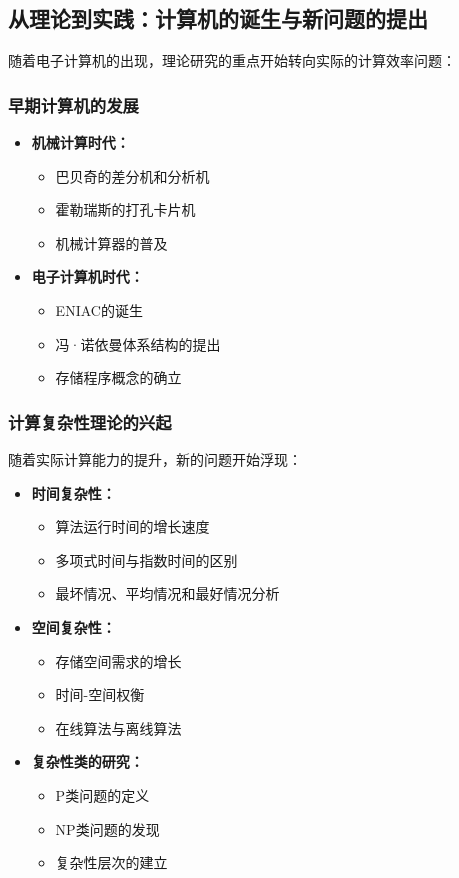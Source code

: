\documentclass[a4paper,12pt]{ctexart}
\begin{document}
\subsection{从理论到实践：计算机的诞生与新问题的提出}
随着电子计算机的出现，理论研究的重点开始转向实际的计算效率问题：

\subsubsection{早期计算机的发展}
\begin{itemize}
    \item \textbf{机械计算时代：}
        \begin{itemize}
            \item 巴贝奇的差分机和分析机
            \item 霍勒瑞斯的打孔卡片机
            \item 机械计算器的普及
        \end{itemize}
    \item \textbf{电子计算机时代：}
        \begin{itemize}
            \item ENIAC的诞生
            \item 冯·诺依曼体系结构的提出
            \item 存储程序概念的确立
        \end{itemize}
\end{itemize}

\subsubsection{计算复杂性理论的兴起}
随着实际计算能力的提升，新的问题开始浮现：
\begin{itemize}
    \item \textbf{时间复杂性：}
        \begin{itemize}
            \item 算法运行时间的增长速度
            \item 多项式时间与指数时间的区别
            \item 最坏情况、平均情况和最好情况分析
        \end{itemize}
    \item \textbf{空间复杂性：}
        \begin{itemize}
            \item 存储空间需求的增长
            \item 时间-空间权衡
            \item 在线算法与离线算法
        \end{itemize}
    \item \textbf{复杂性类的研究：}
        \begin{itemize}
            \item P类问题的定义
            \item NP类问题的发现
            \item 复杂性层次的建立
        \end{itemize}
\end{itemize}
\end{document}
